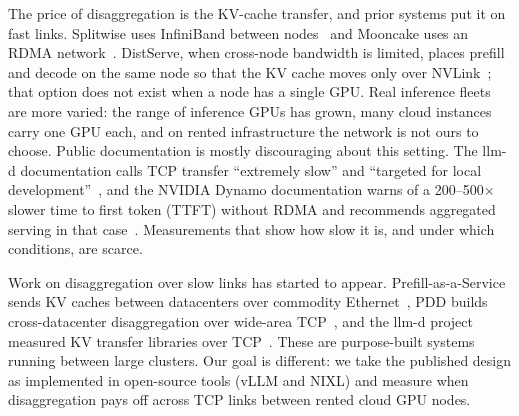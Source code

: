 \documentclass[11pt]{article}
\begin{document}
The price of disaggregation is the KV-cache transfer, and prior systems put it on fast links. Splitwise uses InfiniBand between nodes~\cite{splitwise} and Mooncake uses an RDMA network~\cite{mooncake}. DistServe, when cross-node bandwidth is limited, places prefill and decode on the same node so that the KV cache moves only over NVLink~\cite{distserve}; that option does not exist when a node has a single GPU. Real inference fleets are more varied: the range of inference GPUs has grown, many cloud instances carry one GPU each, and on rented infrastructure the network is not ours to choose. Public documentation is mostly discouraging about this setting. The llm-d documentation calls TCP transfer ``extremely slow'' and ``targeted for local development''~\cite{llmddocs}, and the NVIDIA Dynamo documentation warns of a 200--500$\times$ slower time to first token (TTFT) without RDMA and recommends aggregated serving in that case~\cite{dynamodocs}. Measurements that show how slow it is, and under which conditions, are scarce.

Work on disaggregation over slow links has started to appear. Prefill-as-a-Service sends KV caches between datacenters over commodity Ethernet~\cite{prfaas}, PDD builds cross-datacenter disaggregation over wide-area TCP~\cite{pdd}, and the llm-d project measured KV transfer libraries over TCP~\cite{llmdblog}. These are purpose-built systems running between large clusters. Our goal is different: we take the published design as implemented in open-source tools (vLLM and NIXL) and measure when disaggregation pays off across TCP links between rented cloud GPU nodes.
\end{document}
